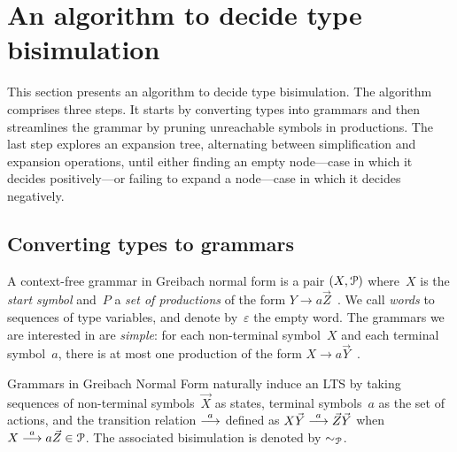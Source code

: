\section{An algorithm to decide type bisimulation}
\label{sec:algorithm}



This section presents an algorithm to decide type bisimulation. The
algorithm comprises three steps. It starts by converting types into
grammars and then streamlines the grammar by pruning unreachable symbols
in productions. The last step explores an expansion tree, alternating
between simplification and expansion operations, until either finding
an empty node---case in which it decides positively---or failing to
expand a node---case in which it decides negatively.

\subsection{Converting types to grammars}
\label{subsec:typeToGrammar}

A context-free grammar in Greibach normal form is a pair
$(X,\mathcal P)$ where~$X$ is the \emph{start symbol} and~$P$ a
\emph{set of productions} of the form
$Y \rightarrow a\vec Z$~\cite{GNF}. We call \emph{words} to sequences
of type variables, and denote by~$\varepsilon$ the empty word.
%
The grammars we are interested in are \emph{simple}: for each
non-terminal symbol~$X$ and each terminal symbol~$a$, there is at most
one production of the form
$X \rightarrow a\vec Y$~\cite{simpleGrammar}. 

Grammars in Greibach Normal Form naturally induce an LTS by taking
sequences of non-terminal symbols~$\vec X$ as states, terminal
symbols~$a$ as the set of actions, and the transition relation
$\stackrel{a}{\longrightarrow}$ defined as $X\vec Y\stackrel{a}{\longrightarrow} \vec Z\vec Y$ when
$X \stackrel{a}{\longrightarrow} a\vec Z \in\mathcal P$.  The
associated bisimulation is denoted by $\sim_{\mathcal P}$.


